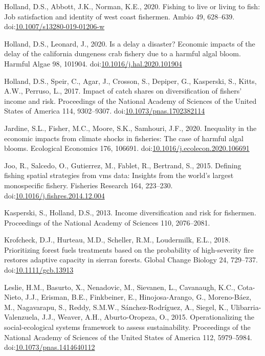 \documentclass[]{elsarticle} %
\begin{document}
\leavevmode\hypertarget{ref-Holland2020}{}%
Holland, D.S., Abbott, J.K., Norman, K.E., 2020. Fishing to live or
living to fish: Job satisfaction and identity of west coast fishermen.
Ambio 49, 628--639.
doi:\href{https://doi.org/10.1007/s13280-019-01206-w}{10.1007/s13280-019-01206-w}

\leavevmode\hypertarget{ref-Holland2020a}{}%
Holland, D.S., Leonard, J., 2020. Is a delay a disaster? Economic
impacts of the delay of the california dungeness crab fishery due to a
harmful algal bloom. Harmful Algae 98, 101904.
doi:\href{https://doi.org/10.1016/j.hal.2020.101904}{10.1016/j.hal.2020.101904}

\leavevmode\hypertarget{ref-Holland2017}{}%
Holland, D.S., Speir, C., Agar, J., Crosson, S., Depiper, G., Kasperski,
S., Kitts, A.W., Perruso, L., 2017. Impact of catch shares on
diversification of fishers' income and risk. Proceedings of the National
Academy of Sciences of the United States of America 114, 9302--9307.
doi:\href{https://doi.org/10.1073/pnas.1702382114}{10.1073/pnas.1702382114}

\leavevmode\hypertarget{ref-Jardine2020}{}%
Jardine, S.L., Fisher, M.C., Moore, S.K., Samhouri, J.F., 2020.
Inequality in the economic impacts from climate shocks in fisheries: The
case of harmful algal blooms. Ecological Economics 176, 106691.
doi:\href{https://doi.org/10.1016/j.ecolecon.2020.106691}{10.1016/j.ecolecon.2020.106691}

\leavevmode\hypertarget{ref-Joo2015}{}%
Joo, R., Salcedo, O., Gutierrez, M., Fablet, R., Bertrand, S., 2015.
Defining fishing spatial strategies from vms data: Insights from the
world's largest monospecific fishery. Fisheries Research 164, 223--230.
doi:\href{https://doi.org/10.1016/j.fishres.2014.12.004}{10.1016/j.fishres.2014.12.004}

\leavevmode\hypertarget{ref-Kasperski2013}{}%
Kasperski, S., Holland, D.S., 2013. Income diversification and risk for
fishermen. Proceedings of the National Academy of Sciences 110,
2076--2081.

\leavevmode\hypertarget{ref-Krofcheck2018}{}%
Krofcheck, D.J., Hurteau, M.D., Scheller, R.M., Loudermilk, E.L., 2018.
Prioritizing forest fuels treatments based on the probability of
high-severity fire restores adaptive capacity in sierran forests. Global
Change Biology 24, 729--737.
doi:\href{https://doi.org/10.1111/gcb.13913}{10.1111/gcb.13913}

\leavevmode\hypertarget{ref-Leslie2015}{}%
Leslie, H.M., Basurto, X., Nenadovic, M., Sievanen, L., Cavanaugh, K.C.,
Cota-Nieto, J.J., Erisman, B.E., Finkbeiner, E., Hinojosa-Arango, G.,
Moreno-Báez, M., Nagavarapu, S., Reddy, S.M.W., Sánchez-Rodríguez, A.,
Siegel, K., Ulibarria-Valenzuela, J.J., Weaver, A.H., Aburto-Oropeza,
O., 2015. Operationalizing the social-ecological systems framework to
assess sustainability. Proceedings of the National Academy of Sciences
of the United States of America 112, 5979--5984.
doi:\href{https://doi.org/10.1073/pnas.1414640112}{10.1073/pnas.1414640112}
\end{document}
